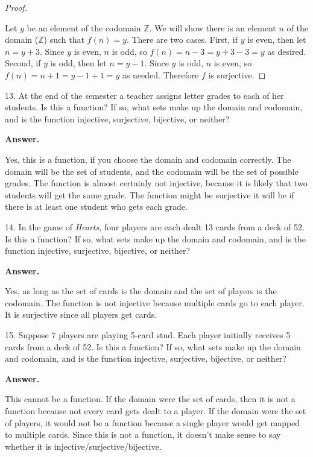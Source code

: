 \documentclass[10pt,]{book}
\theoremstyle{plain}
\theoremstyle{definition}
\theoremstyle{definition}
\theoremstyle{definition}
\numberwithin{equation}{section}
\def\Z{\mathbb Z}
\begin{document}
\begin{exerciselist}
\begin{enumerate}[label=(\alph*)]
\begin{proof}\hypertarget{proof-2}{}

Let \(y\) be an element of the codomain \(\Z\). We will show there is an element \(n\) of the domain (\(\Z\)) such that \(f(n) = y\). There are two cases. First, if \(y\) is even, then let \(n = y+3\). Since \(y\) is even, \(n\) is odd, so \(f(n) = n-3 = y+3-3 = y\) as desired. Second, if \(y\) is odd, then let \(n = y-1\). Since \(y\) is odd, \(n\) is even, so \(f(n) = n+1 = y-1+1 = y\) as needed. Therefore \(f\) is surjective.
%
\end{proof}
\end{enumerate}
\item[13.]\hypertarget{exercise-29}{}
At the end of the semester a teacher assigns letter grades to each of her students. Is this a function? If so, what sets make up the domain and codomain, and is the function injective, surjective, bijective, or neither?
%
\par\smallskip
\par\smallskip
\noindent\textbf{Answer.}\hypertarget{answer-29}{}\quad

Yes, this is a function, if you choose the domain and codomain correctly. The domain will be the set of students, and the codomain will be the set of possible grades. The function is almost certainly not injective, because it is likely that two students will get the same grade. The function might be surjective \textendash{} it will be if there is at least one student who gets each grade.
%
\item[14.]\hypertarget{exercise-30}{}
In the game of \emph{Hearts}, four players are each dealt 13 cards from a deck of 52. Is this a function? If so, what sets make up the domain and codomain, and is the function injective, surjective, bijective, or neither?
%
\par\smallskip
\par\smallskip
\noindent\textbf{Answer.}\hypertarget{answer-30}{}\quad

Yes, as long as the set of cards is the domain and the set of players is the codomain. The function is not injective because multiple cards go to each player. It is surjective since all players get cards.
%
\item[15.]\hypertarget{exercise-31}{}
Suppose 7 players are playing 5-card stud. Each player initially receives 5 cards from a deck of 52. Is this a function? If so, what sets make up the domain and codomain, and is the function injective, surjective, bijective, or neither?
%
\par\smallskip
\par\smallskip
\noindent\textbf{Answer.}\hypertarget{answer-31}{}\quad

This cannot be a function. If the domain were the set of cards, then it is not a function because not every card gets dealt to a player. If the domain were the set of players, it would not be a function because a single player would get mapped to multiple cards. Since this is not a function, it doesn't make sense to say whether it is injective/surjective/bijective.
%
\end{exerciselist}
\end{document}

